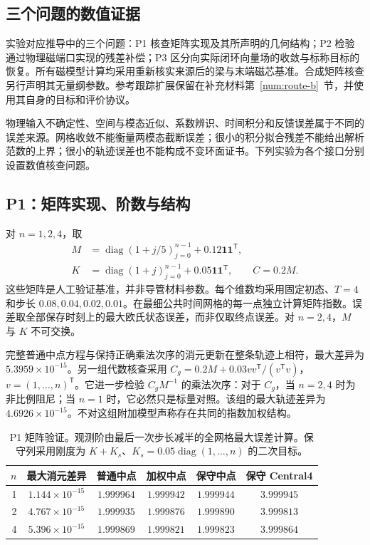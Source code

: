\subsection{三个问题的数值证据}
\label{num:scope}
实验对应推导中的三个问题：P1 核查矩阵实现及其所声明的几何结构；P2 检验通过物理磁端口实现的残差补偿；P3 区分向实际闭环向量场的收敛与标称目标的恢复。所有磁模型计算均采用重新核实来源后的梁与末端磁芯基准。合成矩阵核查另行声明其无量纲参数。参考跟踪扩展保留在补充材料第~\ref{num:route-b}~节，并使用其自身的目标和评价协议。

物理输入不确定性、空间与模态近似、系数辨识、时间积分和反馈误差属于不同的误差来源。网格收敛不能衡量两模态截断误差；很小的积分拟合残差不能给出解析范数的上界；很小的轨迹误差也不能构成不变环面证书。下列实验为各个接口分别设置数值核查问题。

\subsection{P1：矩阵实现、阶数与结构}
\label{num:p1}
对 $n=1,2,4$，取
\begin{equation}
 \begin{split}
 M&=\operatorname{diag}(1+j/5)_{j=0}^{n-1}
       +0.12\boldsymbol1\boldsymbol1^{\mathsf T},\\
 K&=\operatorname{diag}(1+j)_{j=0}^{n-1}
       +0.05\boldsymbol1\boldsymbol1^{\mathsf T},\qquad C=0.2M.
 \end{split}
 \label{num:matrix-data}
\end{equation}
这些矩阵是人工验证基准，并非导管材料参数。每个维数均采用固定初态、$T=4$ 和步长 $0.08,0.04,0.02,0.01$。在最细公共时间网格的每一点独立计算矩阵指数。误差取全部保存时刻上的最大欧氏状态误差，而非仅取终点误差。对 $n=2,4$，$M$ 与 $K$ 不可交换。

完整普通中点方程与保持正确乘法次序的消元更新在整条轨迹上相符，最大差异为 $5.3959\times10^{-15}$。另一组代数核查采用 $C_g=0.2M+0.03vv^{\mathsf T}/(v^{\mathsf T}v)$，$v=(1,\ldots,n)^{\mathsf T}$。它进一步检验 $C_gM^{-1}$ 的乘法次序：对于 $C_g$，当 $n=2,4$ 时为非比例阻尼；当 $n=1$ 时，它必然只是标量对照。该组的最大轨迹差异为 $4.6926\times10^{-15}$。不对这组附加模型声称存在共同的指数加权结构。

\begin{table}[t]
\centering
\caption{P1 矩阵验证。观测阶由最后一次步长减半的全网格最大误差计算。保守列采用刚度为 $K+K_s$、$K_s=0.05\operatorname{diag}(1,\ldots,n)$ 的二次目标。}
\label{num:matrix-benchmark}
\small
\begin{tabular}{rccccc}
\toprule
$n$ & 最大消元差异 & 普通中点 & 加权中点 & 保守中点 & 保守 Central4\\
\midrule
1 & $1.144\times10^{-15}$ & $1.999964$ & $1.999942$ & $1.999944$ & $3.999945$ \\
2 & $4.767\times10^{-15}$ & $1.999935$ & $1.999876$ & $1.999890$ & $3.999813$ \\
4 & $5.396\times10^{-15}$ & $1.999869$ & $1.999821$ & $1.999823$ & $3.999864$ \\
\bottomrule
\end{tabular}
\end{table}


